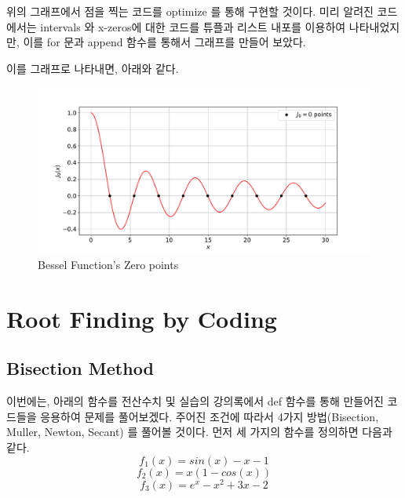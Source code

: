\documentclass[11pt]{article}
\begin{document}
\noindent
 위의 그래프에서 점을 찍는 코드를 optimize 를 통해 구현할 것이다. 미리 알려진 코드에서는 intervals 와 x-zeros에 대한 코드를 튜플과 리스트 내포를 이용하여 나타내었지만, 이를 for 문과 append 함수를 통해서 그래프를 만들어 보았다.
 
\vspace{5mm}

\vspace{5mm}

\noindent
이를 그래프로 나타내면, 아래와 같다.

\begin{figure}[!ht]
  \centering
  \includegraphics[width=1\textwidth]{Zeros_of_Bessel_Fuctions_Homework1.pdf}
  \caption{Bessel Function's Zero points}
\end{figure}
\clearpage














\section{Root Finding by Coding}
\subsection{Bisection Method} 
\noindent
이번에는, 아래의 함수를 전산수치 및 실습의 강의록에서 def 함수를 통해 만들어진 코드들을 응용하여 문제를 풀어보겠다. 주어진 조건에 따라서 4가지 방법(Bisection, Muller, Newton, Secant) 를 풀어볼 것이다. 먼저 세 가지의 함수를 정의하면 다음과 같다. 
\begin{equation}
f_1(x) = sin(x) - x - 1
\end{equation}
\begin{equation}
f_2(x) = x(1 - cos(x))
\end{equation}
\begin{equation}
f_3(x) = e^{x} - x^2 + 3x - 2 
\end{equation}
\end{document}
